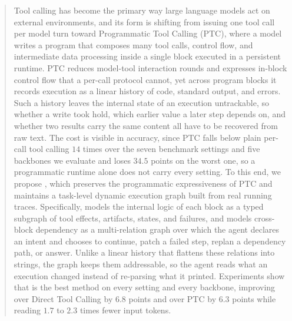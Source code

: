 \begin{abstract}
Tool calling has become the primary way large language models act on external environments, and its form is shifting from issuing one tool call per model turn toward Programmatic Tool Calling (PTC), where a model writes a program that composes many tool calls, control flow, and intermediate data processing inside a single block executed in a persistent runtime.
PTC reduces model-tool interaction rounds and expresses in-block control flow that a per-call protocol cannot, yet across program blocks it records execution as a linear history of code, standard output, and errors.
Such a history leaves the internal state of an execution untrackable, so whether a write took hold, which earlier value a later step depends on, and whether two results carry the same content all have to be recovered from raw text.
The cost is visible in accuracy, since PTC falls below plain per-call tool calling $14$ times over the seven benchmark settings and five backbones we evaluate and loses $34.5$ points on the worst one, so a programmatic runtime alone does not carry every setting.
To this end, we propose \method, which preserves the programmatic expressiveness of PTC and maintains a task-level dynamic execution graph built from real running traces.
Specifically, \method models the internal logic of each block as a typed subgraph of tool effects, artifacts, states, and failures, and models cross-block dependency as a multi-relation graph over which the agent declares an intent and chooses to continue, patch a failed step, replan a dependency path, or answer.
Unlike a linear history that flattens these relations into strings, the graph keeps them addressable, so the agent reads what an execution changed instead of re-parsing what it printed.
Experiments show that \method is the best method on every setting and every backbone, improving over Direct Tool Calling by $6.8$ points and over PTC by $6.3$ points while reading $1.7$ to $2.3$ times fewer input tokens.
\end{abstract}
